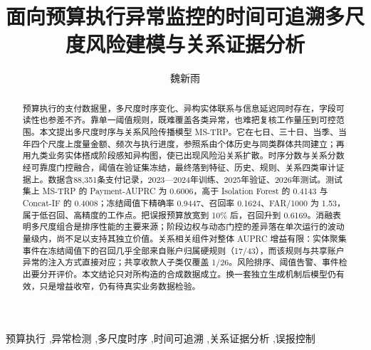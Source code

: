 \documentclass[a4paper,fleqn]{cas-dc}
\begin{document}
\shorttitle{}

\title[mode=title]{面向预算执行异常监控的时间可追溯多尺度风险建模与关系证据分析}

\author[1]{魏新雨}


\begin{abstract}
预算执行的支付数据里，多尺度时序变化、异构实体联系与信息延迟同时存在，字段可读性也参差不齐。靠单一阈值规则，既难覆盖各类异常，也难把复核工作量压到可控范围。本文提出多尺度时序与关系风险传播模型 MS-TRP。它在七日、三十日、当季、当年四个尺度上度量金额、频次与执行进度，参照系由个体历史与同类群体共同建立；再用九类业务实体搭成阶段感知异构图，使已出现风险沿关系扩散。时序分数与关系分数经可靠度门控融合，阈值在验证集冻结，最终落到特征、历史、规则、关系四类审计证据上。数据含88,351条支付记录，2023—2024年训练、2025年验证、2026年测试。测试集上 MS-TRP 的 Payment-AUPRC 为 0.6006，高于 Isolation Forest 的 0.4143 与 Concat-IF 的 0.4008；冻结阈值下精确率 0.9447、召回率 0.1624、FAR/1000 为 1.53，属于低召回、高精度的工作点。把误报预算放宽到 10\% 后，召回升到 0.6169。消融表明多尺度组合是排序性能的主要来源；阶段边权与动态门控的差异落在单次运行的波动量级内，尚不足以支持其独立价值。关系相关组件对整体 AUPRC 增益有限：实体聚集事件在冻结阈值下的召回几乎全部来自账户归属硬规则（17/43），而该规则与共享账户异常的注入方式直接对应；共享收款人子类仅覆盖 1/26。风险排序、阈值告警、事件检出要分开评价。本文结论只对所构造的合成数据成立。换一套独立生成机制后模型仍有效，只是增益收窄，仍有待真实业务数据检验。
\end{abstract}
\begin{keywords}
预算执行 \sep 异常检测 \sep 多尺度时序 \sep 时间可追溯 \sep 关系证据分析 \sep 误报控制
\end{keywords}

\maketitle

\raggedbottom
\setcounter{topnumber}{3}
\setcounter{bottomnumber}{2}
\setcounter{totalnumber}{5}
\setcounter{dbltopnumber}{2}
\renewcommand{\topfraction}{0.92}
\renewcommand{\bottomfraction}{0.85}
\renewcommand{\textfraction}{0.07}
\renewcommand{\floatpagefraction}{0.75}
\renewcommand{\dbltopfraction}{0.92}
\renewcommand{\dblfloatpagefraction}{0.75}
\setlength{\textfloatsep}{10pt plus 2pt minus 2pt}
\setlength{\dbltextfloatsep}{10pt plus 2pt minus 2pt}
\setlength{\floatsep}{8pt plus 2pt minus 2pt}
\setlength{\dblfloatsep}{8pt plus 2pt minus 2pt}
\setlength{\intextsep}{8pt plus 2pt minus 2pt}
\setlength{\emergencystretch}{1em}
\end{document}
